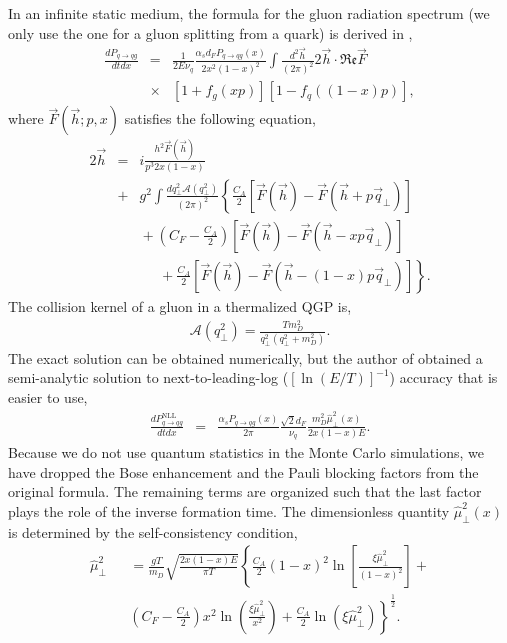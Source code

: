 \documentclass[aps, prc, reprint, amsmath, groupedaddress, nofootinbib]{revtex4-1}
\begin{document}
In an infinite static medium, the formula for the gluon radiation spectrum (we only use the one for a gluon splitting from a quark) is derived in \cite{Arnold:2002zm,Arnold:2003zc},
\begin{eqnarray}\label{eq:AMY-1}
\nonumber
\frac{dP_{q\rightarrow qg}}{dt dx} &=& \frac{1}{2E\nu_q} \frac{\alpha_s d_F P_{q\rightarrow qg}(x)}{2x^2(1-x)^2}\int\frac{d^2\vec{h}}{(2\pi)^2}2\vec{h}\cdot \mathfrak{Re} \vec{F} \\
&\times& [1+f_g(xp)][1-f_q((1-x)p)],
\end{eqnarray}
where $\vec{F}(\vec{h}; p, x)$ satisfies the following equation,
\begin{eqnarray}\label{eq:AMY-2}
\nonumber
2\vec{h} &=& i\frac{h^2 \vec{F}(\vec{h})}{p^3 2x(1-x)} \\
\nonumber
&+& g^2\int \frac{dq_\perp^2 \mathcal{A}(q_\perp^2)}{(2\pi)^2}\left\{\frac{C_A}{2}\left[\vec{F}(\vec{h}) - \vec{F}(\vec{h}+p\vec{q}_\perp)\right]\right. \\
\nonumber
&& \phantom{} + \left(C_F - \frac{C_A}{2}\right)\left[\vec{F}(\vec{h}) - \vec{F}(\vec{h}-xp\vec{q}_\perp)\right] \\
&& \phantom{sss} + \left. \frac{C_A}{2}\left[\vec{F}(\vec{h}) - \vec{F}(\vec{h}-(1-x)p\vec{q}_\perp)\right] \right\}.
\end{eqnarray}
The collision kernel of a gluon in a thermalized QGP is,
\begin{eqnarray}\label{eq:kernel}
\mathcal{A}(q_\perp^2) = \frac{T m_D^2}{q_\perp^2(q_\perp^2+m_D^2)}.
\end{eqnarray}
The exact solution can be obtained numerically, but the author of \cite{Arnold:2008zu} obtained a semi-analytic solution to next-to-leading-log ($[\ln(E/T)]^{-1}$) accuracy that is easier to use,
\begin{eqnarray}\label{eq:AMY-NLL}
\frac{dP_{q\rightarrow qg}^{\textrm{NLL}}}{dt dx} &=& \frac{\alpha_s P_{q\rightarrow qg}(x)}{2\pi}\frac{ \sqrt{2} d_F }{\nu_q }  \frac{m_D^2\hat{\mu}_\perp^2(x)}{2x(1-x)E}. 
\end{eqnarray}
Because we do not use quantum statistics in the Monte Carlo simulations, we have dropped the Bose enhancement and the Pauli blocking factors from the original formula.
The remaining terms are organized such that the last factor plays the role of the inverse formation time.
The dimensionless quantity $\hat{\mu}_\perp^2(x)$ is determined by the self-consistency condition,
\begin{eqnarray}\label{eq:AMY-sf}
\nonumber
\hat{\mu}_\perp^2 && = \frac{gT}{m_D} \sqrt{\frac{2x(1-x)E}{\pi T}}\left\{
\frac{C_A}{2}(1-x)^2\ln\left[\frac{\xi\hat{\mu}_\perp^2}{(1-x)^2}\right] + \right. \\
&&\left.\left(C_F-\frac{C_A}{2}\right)x^2\ln\left(\frac{\xi\hat{\mu}_\perp^2}{x^2}\right) + \frac{C_A}{2}\ln(\xi\hat{\mu}_\perp^2)\right\}^{\frac{1}{2}}.
\end{eqnarray}
\end{document}
